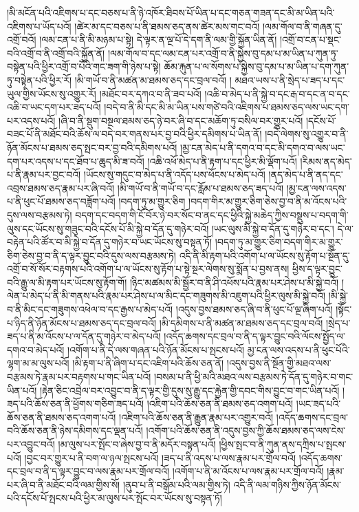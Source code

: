 །མི་མངོན་པའི་འཇིགས་པ་དང་བཅས་པ་ནི་ཉེ་འཁོར་ཐིབས་པོ་ཡིན་པ་དང་གཅན་གཟན་དང་མི་མ་ཡིན་པའི་འཇིགས་པ་ཡོད་པའོ། །ཚེར་མ་དང་བཅས་པ་ནི་ཐམས་ཅད་ནས་ཚེར་མས་གང་བའོ། །ལམ་གོལ་བ་ནི་གཞན་དུ་འགྲོ་བའོ། །ལམ་ངན་པ་ནི་མི་མཉམ་པ་སྟེ། དེ་ལྟར་ན་ལྔ་པོ་དེ་དག་ནི་ལམ་གྱི་སྐྱོན་ཡིན་ནོ། །འགྲོ་བ་ངན་པ་སྡང་བའི་འགྲོ་བ་ནི་འགྲོ་བའི་སྐྱོན་ནོ། །ལམ་གོལ་བ་དང་ལམ་ངན་པར་འགྲོ་བ་ནི་སྐྱེས་བུ་དམ་པ་མ་ཡིན་པ་ཀུན་ཏུ་བསྟེན་པའི་ཕྱིར་འགྲོ་བ་པོའི་གང་ཟག་གི་ཉེས་པ་སྟེ། ཆོམ་རྐུན་པ་ལ་སོགས་པ་སྐྱེས་བུ་དམ་པ་མ་ཡིན་པ་དག་ཀུན་ཏུ་བསྟེན་པའི་ཕྱིར་རོ། །མི་གཡོ་བ་ནི་མཚན་མ་ཐམས་ཅད་དང་བྲལ་བའོ། །
མཐའ་ཡས་པ་ནི་སྲེད་པ་ཟད་པ་དང་ཡུལ་གྱིས་ཡོངས་སུ་འགྱུར་རོ། །མཐོང་བར་དཀའ་བ་ནི་ཟབ་པའོ། །འཆི་བ་མེད་པ་ནི་སྐྱེ་བ་དང་རྒ་བ་དང་ན་བ་དང་འཆི་བ་ཡང་དག་པར་ཟད་པའོ། །བདེ་བ་ནི་མི་དང་མི་མ་ཡིན་པས་གཙེ་བའི་འཇིགས་པ་ཐམས་ཅད་ལས་ཡང་དག་པར་འདས་པའོ། །ཞི་བ་ནི་སྡུག་བསྔལ་ཐམས་ཅད་ཉེ་བར་ཞི་བ་དང་མཆོག་ཏུ་བསིལ་བར་གྱུར་པའོ། །དངོས་པོ་བཟང་པོ་ནི་མཐོང་བའི་ཆོས་ལ་བདེ་བར་གནས་པར་བྱ་བའི་ཕྱིར་དམིགས་པ་ཡིན་ནོ། །བདེ་ལེགས་སུ་འགྱུར་བ་ནི་ཉོན་མོངས་པ་ཐམས་ཅད་སྤང་བར་བྱ་བའི་དམིགས་པའོ། །མྱ་ངན་མེད་པ་ནི་དགའ་བ་དང་མི་དགའ་བ་ལས་ཡང་དག་པར་འདས་པ་དང་ཐོབ་པ་ཆུད་མི་ཟ་བའོ། །འཆི་འཕོ་མེད་པ་ནི་རྟག་པ་དང་ཕྱིར་མི་ལྡོག་པའོ། །རིམས་ནད་མེད་པ་ནི་རྣམ་པར་བྱང་བའོ། །ཡོངས་སུ་གདུང་བ་མེད་པ་ནི་འདོད་པས་ཕོངས་པ་མེད་པའོ། །ནད་མེད་པ་ནི་ནད་དང་འབྲས་ཐམས་ཅད་རྣམ་པར་ཞི་བའོ། །མི་གཡོ་བ་ནི་གཡོ་བ་དང་རློམ་པ་ཐམས་ཅད་ཟད་པའོ། །མྱ་ངན་ལས་འདས་པ་ནི་ཕུང་པོ་ཐམས་ཅད་བཟློག་པའོ། །བདག་ཏུ་མ་གྱུར་ཅིག །བདག་གིར་མ་གྱུར་ཅིག་ཅེས་བྱ་བ་ནི་མ་འོངས་པའི་དུས་ལས་བརྩམས་ཏེ། བདག་དང་བདག་གི་ངོ་བོར་ཉེ་བར་སོང་བ་ནང་དང་ཕྱིའི་སྐྱེ་མཆེད་ཀྱིས་བསྡུས་པ་བདག་གི་ལུས་དང་ཡོངས་སུ་གཟུང་བའི་དངོས་པོ་མི་སྐྱེ་བ་དོན་དུ་གཉེར་བའོ། །ཡང་ལུས་མི་སྐྱེ་བ་དོན་དུ་གཉེར་བ་དང་། དེ་ལ་བརྟེན་པའི་ཚོར་བ་མི་སྐྱེ་བ་དོན་དུ་གཉེར་བ་ཡང་ཡོངས་སུ་བསྟན་ཏོ། །བདག་ཏུ་མ་གྱུར་ཅིག་བདག་གིར་མ་གྱུར་ཅིག་ཅེས་བྱ་བ་ནི་ད་ལྟར་བྱུང་བའི་དུས་ལས་བརྩམས་ཏེ། འདི་ནི་མི་རྟག་པའི་འགོག་པ་ལ་ཡོངས་སུ་རྟོག་པ་སྔོན་དུ་འགྲོ་བ་སོ་སོར་བརྟགས་པའི་འགོག་པ་ལ་ཡོངས་སུ་རྟོག་པ་སྟེ་སྔར་ལེགས་སུ་སྨོན་པ་བྱས་ནས། ཕྱིས་ད་ལྟར་བྱུང་བའི་རྒྱུ་ལ་མི་རྟག་པར་ཡོངས་སུ་རྟོག་གོ། །ཉིང་མཚམས་མི་སྦྱོར་བ་ནི་ཤི་འཕོས་པའི་རྣམ་པར་ཤེས་པ་མི་སྐྱེ་བའོ། །ལེན་པ་མེད་པ་ནི་མི་གནས་པའི་རྣམ་པར་ཤེས་པ་ལ་མིང་དང་གཟུགས་མི་འཇུག་པའི་ཕྱིར་ལུས་མི་སྐྱེ་བའོ། །མི་སྐྱེ་བ་ནི་མིང་དང་གཟུགས་འཕེལ་བ་དང་རྒྱས་པ་མེད་པའོ། །འདུས་བྱས་ཐམས་ཅད་ཞི་བ་ནི་ཕུང་པོ་ལྔ་ཞིག་པའོ། །སྟོང་པ་ཉིད་ནི་ཉོན་མོངས་པ་ཐམས་ཅད་དང་བྲལ་བའོ། །མི་དམིགས་པ་ནི་མཚན་མ་ཐམས་ཅད་དང་བྲལ་བའོ། །སྲེད་པ་ཟད་པ་ནི་མ་འོངས་པ་ལ་དོན་དུ་གཉེར་བ་མེད་པའོ། །འདོད་ཆགས་དང་བྲལ་བ་ནི་ད་ལྟར་བྱུང་བའི་ལོངས་སྤྱོད་ལ་དགའ་བ་མེད་པའོ། །འགོག་པ་ནི་དེ་ལས་གཞན་པའི་ཉོན་མོངས་པ་སྤངས་པའོ། མྱ་ངན་ལས་འདས་པ་ནི་ཕུང་པོའི་ལྷག་མ་མ་ལུས་པའོ། །མི་རྟག་པ་ནི་ཞིག་པ་དང་འཇིག་པའི་ཆོས་ཅན་ནོ། །འདུས་བྱས་ནི་སྔོན་གྱི་མཐའ་ལས་བརྩམས་ཏེ་རྣམ་པར་བརྟགས་པ་གང་ཡིན་པའོ། །བསམ་པ་ནི་ཕྱི་མའི་མཐའ་ལས་བརྩམས་ཏེ་དོན་དུ་གཉེར་བ་གང་ཡིན་པའོ། །རྟེན་ཅིང་འབྲེལ་བར་འབྱུང་བ་ནི་ད་ལྟར་གྱི་དུས་སུ་རྒྱུ་དང་རྐྱེན་གྱི་དབང་གིས་བྱུང་བ་གང་ཡིན་པའོ། །ཟད་པའི་ཆོས་ཅན་ནི་ཕྱོགས་གཅིག་ཟད་པའོ། །འཇིག་པའི་ཆོས་ཅན་ནི་ཐམས་ཅད་འགག་པའོ། །ཡང་ཟད་པའི་ཆོས་ཅན་ནི་ཐམས་ཅད་འགག་པའོ། །འཇིག་པའི་ཆོས་ཅན་ནི་རྒྱུན་རྣམ་པར་འགྱུར་བའོ། །འདོད་ཆགས་དང་བྲལ་བའི་ཆོས་ཅན་ནི་ཉེས་དམིགས་དང་ལྡན་པའོ། །འགོག་པའི་ཆོས་ཅན་ནི་འདུས་བྱས་ཀྱི་ཆོས་ཐམས་ཅད་ལས་ངེས་པར་འབྱུང་བའོ། །མ་ལུས་པར་སྤོང་བ་ཞེས་བྱ་བ་ནི་མདོར་བསྟན་པའོ། །ཕྱིས་སྤང་བ་ནི་ཀུན་ནས་དཀྲིས་པ་སྤངས་པའོ། །བྱང་བར་གྱུར་པ་ནི་བག་ལ་ཉལ་སྤངས་པའོ། །ཟད་པ་ནི་འདས་པ་ལས་རྣམ་པར་གྲོལ་བའོ། །འདོད་ཆགས་དང་བྲལ་བ་ནི་ད་ལྟར་བྱུང་བ་ལས་རྣམ་པར་གྲོལ་བའོ། །འགོག་པ་ནི་མ་འོངས་པ་ལས་རྣམ་པར་གྲོལ་བའོ། །རྣམ་པར་ཞི་བ་ནི་མཐོང་བའི་ལམ་གྱིས་སོ། །ནུབ་པ་ནི་བསྒོམ་པའི་ལམ་གྱིས་ཏེ། འདི་ནི་ལམ་གཉིས་ཀྱིས་ཉོན་མོངས་པའི་དངོས་པོ་སྤངས་པའི་ཕྱིར་མ་ལུས་པར་སྤོང་བར་ཡོངས་སུ་བསྟན་ཏོ། 